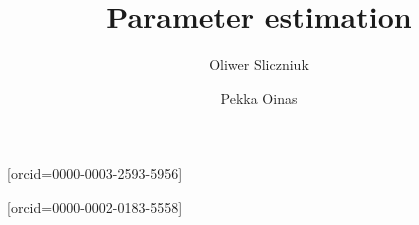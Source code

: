 \documentclass[a4paper,fleqn]{cas-dc}
\begin{document}
 

\title[mode=title]{Parameter estimation}                      


\author[1]{Oliwer Sliczniuk}[orcid=0000-0003-2593-5956]
\cormark[1]

\author[1]{Pekka Oinas}[orcid=0000-0002-0183-5558]


\address[1]{Aalto University, School of Chemical Engineering, Espoo, 02150, Finland}

\end{document}
